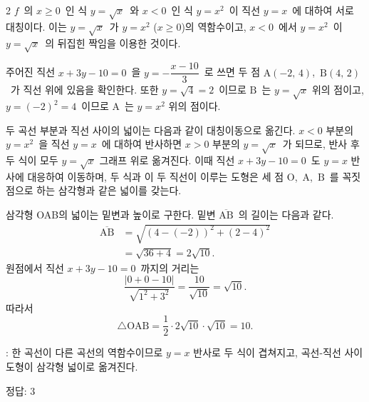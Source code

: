 \documentclass[10pt,fleqn]{article}
\begin{document}
\begin{multicols*}{2}
$f$\ 의 $x \ge 0$\ 인 식 $y = \sqrt{x}$\ 와 $x < 0$\ 인 식 $y = x^{2}$\ 이 직선 $y = x$\ 에 대하여 서로 대칭이다. 이는 $y = \sqrt{x}$\ 가 $y = x^{2}$ ($x \ge 0$)의 역함수이고, $x < 0$\ 에서 $y = x^{2}$\ 이 $y = \sqrt{x}$\ 의 뒤집힌 짝임을 이용한 것이다.

주어진 직선 $x + 3y - 10 = 0$\ 을 $y = -\dfrac{x - 10}{3}$\ 로 쓰면 두 점 $\mathrm{A}(-2,\, 4)$,\ $\mathrm{B}(4,\, 2)$\ 가 직선 위에 있음을 확인한다. 또한 $y = \sqrt{4} = 2$\ 이므로 $\mathrm{B}$\ 는 $y = \sqrt{x}$ 위의 점이고, $y = (-2)^{2} = 4$\ 이므로 $\mathrm{A}$\ 는 $y = x^{2}$ 위의 점이다.

두 곡선 부분과 직선 사이의 넓이는 다음과 같이 대칭이동으로 옮긴다. $x < 0$ 부분의 $y = x^{2}$\ 을 직선 $y = x$\ 에 대하여 반사하면 $x > 0$ 부분의 $y = \sqrt{x}$\ 가 되므로, 반사 후 두 식이 모두 $y = \sqrt{x}$ 그래프 위로 옮겨진다. 이때 직선 $x + 3y - 10 = 0$\ 도 $y = x$ 반사에 대응하여 이동하며, 두 식과 이 두 직선이 이루는 도형은 세 점 $\mathrm{O}$,\ $\mathrm{A}$,\ $\mathrm{B}$\ 를 꼭짓점으로 하는 삼각형과 같은 넓이를 갖는다.

삼각형 OAB의 넓이는 밑변과 높이로 구한다. 밑변 $\overline{\mathrm{AB}}$\ 의 길이는 다음과 같다.
\begin{align*}
  \overline{\mathrm{AB}} &= \sqrt{(4 - (-2))^{2} + (2 - 4)^{2}}\\
  &= \sqrt{36 + 4} = 2\sqrt{10}.
\end{align*}
원점에서 직선 $x + 3y - 10 = 0$\ 까지의 거리는
\[ \dfrac{|0 + 0 - 10|}{\sqrt{1^{2} + 3^{2}}} = \dfrac{10}{\sqrt{10}} = \sqrt{10}. \]
따라서
\[ \triangle \mathrm{OAB} = \dfrac{1}{2} \cdot 2\sqrt{10} \cdot \sqrt{10} = 10. \]

\begin{dmcriticalpoint}
: 한 곡선이 다른 곡선의 역함수이므로 $y=x$ 반사로 두 식이 겹쳐지고, 곡선-직선 사이 도형이 삼각형 넓이로 옮겨진다.
\end{dmcriticalpoint}

\begin{dmanswerbox}
정답: $3$
\end{dmanswerbox}


\end{multicols*}
\end{document}
